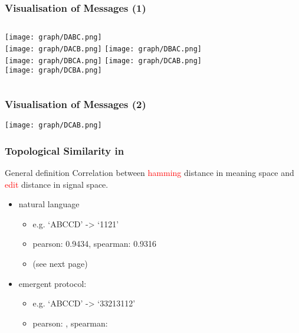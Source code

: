\documentclass[compress,mathserif,xcolor=dvipsnames,svgnames,aspectratio=43]{beamer}
\begin{document}
\begin{frame}[c]
  \frametitle{Visualisation of Messages (1)}
  \begin{columns}
    \texttt{[image: graph/DABC.png]} \\
    \texttt{[image: graph/DACB.png]}
    \texttt{[image: graph/DBAC.png]} \\
    \texttt{[image: graph/DBCA.png]}
    \texttt{[image: graph/DCAB.png]} \\
    \texttt{[image: graph/DCBA.png]}
  \end{columns}
\end{frame}

\begin{frame}[c]
  \frametitle{Visualisation of Messages (2)}
  \texttt{[image: graph/DCAB.png]}
\end{frame}

\begin{frame}[c]
  \frametitle{Topological Similarity in \cite{brighton2006understanding}}
  \begin{block}{General definition}
    Correlation between \textcolor{red}{hamming} distance in meaning space and \textcolor{red}{edit} distance in signal space.
  \end{block}
  \begin{itemize}
    \item natural language
      \begin{itemize}
        \item e.g. `ABCCD' -> `1121'
        \item pearson: 0.9434, spearman: 0.9316
        \item (see next page)
      \end{itemize}
    \item emergent protocol:
    \begin{itemize}
      \item e.g. `ABCCD' -> `33213112'
      \item pearson: , spearman:
    \end{itemize}
  \end{itemize}
\end{frame}
\end{document}

